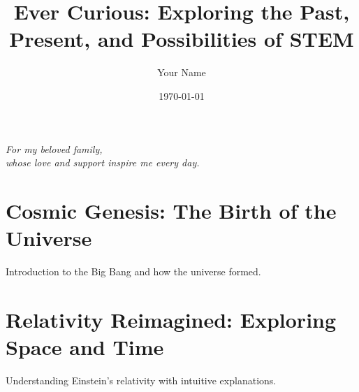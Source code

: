 \documentclass[12pt, twoside]{book}
\begin{document}
\title{Ever Curious: Exploring the Past, Present, and Possibilities of STEM}
\author{Your Name}
\date{\today}
\maketitle

\frontmatter

\clearpage
\thispagestyle{empty} %
\begin{center}
    \emph{For my beloved family,\\[0.5em]
    whose love and support inspire me every day.}
\end{center}
\clearpage




\tableofcontents
\mainmatter

%
%

\chapter{Cosmic Genesis: The Birth of the Universe}
Introduction to the Big Bang and how the universe formed.

\chapter{Relativity Reimagined: Exploring Space and Time}
Understanding Einstein's relativity with intuitive explanations.


\backmatter
\end{document}
